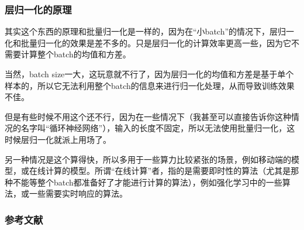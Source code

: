 \documentclass{ctexbeamer}
\begin{document}
\begin{frame}
    \frametitle{层归一化的原理}

    其实这个东西的原理和批量归一化是一样的，因为在“小batch”的情况下，层归一化和批量归一化的效果是差不多的。只是层归一化的计算效率更高一些，因为它不需要计算整个batch的均值和方差。

当然，batch size一大，这玩意就不行了，因为层归一化的均值和方差是基于单个样本的，所以它无法利用整个batch的信息来进行归一化处理，从而导致训练效果不佳。

但是有些时候不用这个还不行，因为在一些情况下（我甚至可以直接告诉你这种情况的名字叫“循环神经网络”），输入的长度不固定，所以无法使用批量归一化，这时候层归一化就派上用场了。

另一种情况是这个算得快，所以多用于一些算力比较紧张的场景，例如移动端的模型，或在线计算的模型。所谓“在线计算”者，指的是需要即时性的算法（尤其是那种不能等整个batch都准备好了才能进行计算的算法），例如强化学习中的一些算法，或一些需要实时响应的算法。

\end{frame}

\begin{frame}
    \frametitle{参考文献}

    \printbibliography

\end{frame}
\end{document}
